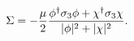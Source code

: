 \begin{equation}
\Sigma = -{\mu \over 2}{\phi^\dagger \sigma_3 \phi 
+ \chi^\dagger \sigma_3 \chi \over 
|\phi|^2+|\chi|^2 } .
\end{equation}

